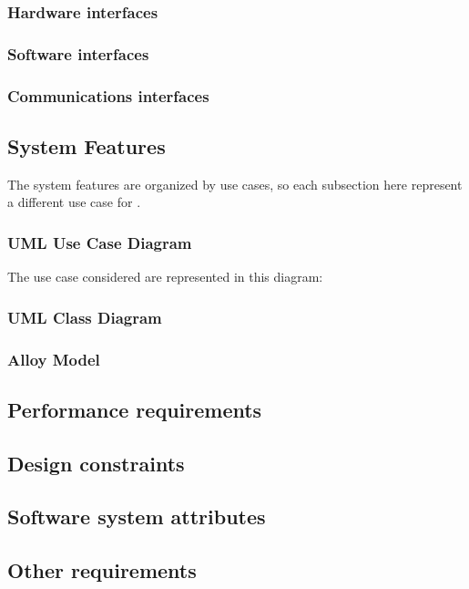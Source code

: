 \subsubsection{Hardware interfaces}
\subsubsection{Software interfaces}
\subsubsection{Communications interfaces}
\subsection{System Features}
The system features are organized by use cases, so each subsection here represent a different use case for \myTaxiService{}.\par
\subsubsection{UML Use Case Diagram}
The use case considered are represented in this diagram: 

\subsubsection{UML Class Diagram}
\subsubsection{Alloy Model}
\subsection{Performance requirements}
\subsection{Design constraints}
\subsection{Software system attributes}
\subsection{Other requirements}
